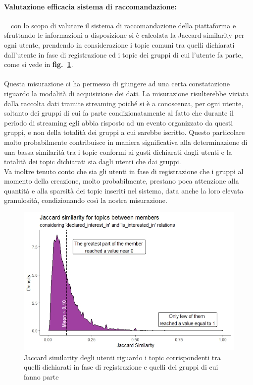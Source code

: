\documentclass[fleqn,10pt]{SelfArx} %
\begin{document}
{\paragraph{Valutazione efficacia sistema di raccomandazione:} $~~~$ con lo scopo di valutare il sistema di raccomandazione della piattaforma e sfruttando le informazioni a disposizione si è calcolata la Jaccard similarity per ogni utente, prendendo in considerazione i topic comuni tra quelli dichiarati dall'utente in fase di registrazione ed i topic dei gruppi di cui l'utente fa parte, come si vede in \textbf{fig.~\ref{jaccard_similarity}}. \\
\\Questa misurazione ci ha permesso di giungere ad una certa constatazione riguardo la modalità di acquisizione dei dati. 
La misurazione risulterebbe viziata dalla raccolta dati tramite streaming poiché si è a conoscenza, per ogni utente, soltanto dei gruppi di cui fa parte condizionatamente al fatto che durante il periodo di streaming egli abbia risposto ad un evento organizzato da questi gruppi, e non della totalità dei gruppi a cui sarebbe iscritto. 
Questo particolare molto probabilmente contribuisce in maniera significativa alla determinazione di una bassa similarità tra i topic conformi ai gusti dichiarati dagli utenti e la totalità dei topic dichiarati sia dagli utenti che dai gruppi. 
\\Va inoltre tenuto conto che sia gli utenti in fase di registrazione che i gruppi al momento della creazione, molto probabilmente, prestano poca attenzione alla quantità e alla sparsità dei topic inseriti nel sistema, data anche la loro elevata granulosità, condizionando così la nostra misurazione. 
\begin{figure}
\centering
\includegraphics[width = 8.7 cm, height = 5 cm]{jaccard_similarity.jpeg}
\vspace*{0.01cm}
\caption{\footnotesize \label{jaccard_similarity} Jaccard similarity degli utenti riguardo i topic corrispondenti tra quelli dichiarati in fase di registrazione e quelli dei gruppi di cui fanno parte}
\end{figure}
}
\end{document}
